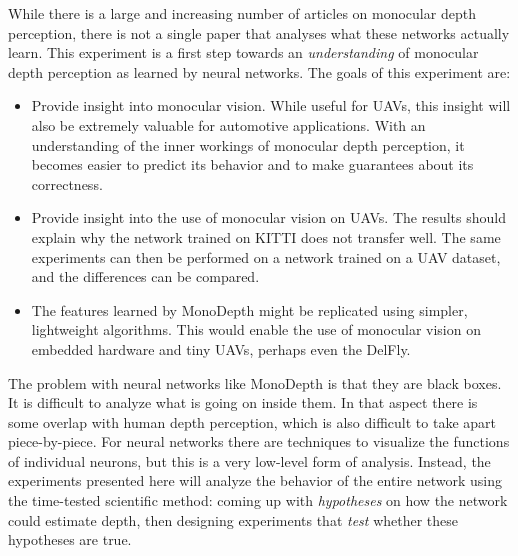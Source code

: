 While there is a large and increasing number of articles on monocular depth perception, there is not a single paper that analyses what these networks actually learn.
This experiment is a first step towards an \emph{understanding} of monocular depth perception as learned by neural networks.
The goals of this experiment are:
\begin{itemize}
\item Provide insight into monocular vision. While useful for \acp{UAV}, this insight will also be extremely valuable for automotive applications. With an understanding of the inner workings of monocular depth perception, it becomes easier to predict its behavior and to make guarantees about its correctness.
\item Provide insight into the use of monocular vision on \acp{UAV}. The results should explain why the network trained on KITTI does not transfer well. The same experiments can then be performed on a network trained on a \ac{UAV} dataset, and the differences can be compared.
\item The features learned by MonoDepth might be replicated using simpler, lightweight algorithms. This would enable the use of monocular vision on embedded hardware and tiny \acp{UAV}, perhaps even the DelFly.
\end{itemize}

The problem with neural networks like MonoDepth is that they are black boxes.
It is difficult to analyze what is going on inside them.
In that aspect there is some overlap with human depth perception, which is also difficult to take apart piece-by-piece.
For neural networks there are techniques to visualize the functions of individual neurons, but this is a very low-level form of analysis.
Instead, the experiments presented here will analyze the behavior of the entire network using the time-tested scientific method: coming up with \emph{hypotheses} on how the network could estimate depth, then designing experiments that \emph{test} whether these hypotheses are true.

